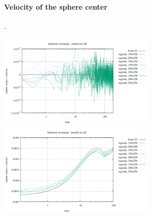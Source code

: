 \paragraph{Velocity of the sphere center}.
\begin{center}
\includegraphics[width=7.5cm]{images/stokes_sphere_fs2D/center_velocity_x.pdf}
\includegraphics[width=7.5cm]{images/stokes_sphere_fs2D/center_velocity_y.pdf}
\end{center}

